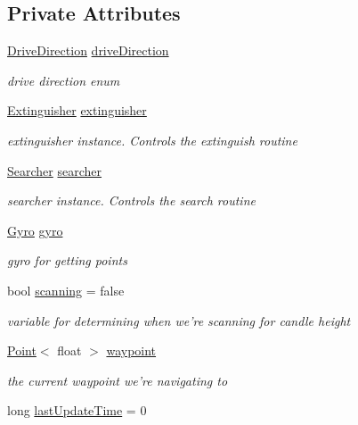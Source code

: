 \subsection*{Private Attributes}
\begin{DoxyCompactItemize}
\item 
\hyperlink{DriveMotor_8hpp_a077d9d13989efa3142086ea83cbb1e68}{Drive\-Direction} \hyperlink{classRobot_af15d2eaa46a9736e5d3d3aa9e8a9751c}{drive\-Direction}
\begin{DoxyCompactList}\small\item\em drive direction enum \end{DoxyCompactList}\item 
\hyperlink{classExtinguisher}{Extinguisher} \hyperlink{classRobot_a506ec05fcf24208b486c48367b003e96}{extinguisher}
\begin{DoxyCompactList}\small\item\em extinguisher instance. Controls the extinguish routine \end{DoxyCompactList}\item 
\hyperlink{classSearcher}{Searcher} \hyperlink{classRobot_af0ba30c47b84dc976f5bb7bd978f95ef}{searcher}
\begin{DoxyCompactList}\small\item\em searcher instance. Controls the search routine \end{DoxyCompactList}\item 
\hyperlink{classGyro}{Gyro} \hyperlink{classRobot_adafaf54e27eb3bd0cf08e32d7206e6a8}{gyro}
\begin{DoxyCompactList}\small\item\em gyro for getting points \end{DoxyCompactList}\item 
bool \hyperlink{classRobot_adcfb83201cfb8c8a7588d83aae0fc5be}{scanning} = false
\begin{DoxyCompactList}\small\item\em variable for determining when we're scanning for candle height \end{DoxyCompactList}\item 
\hyperlink{classPoint}{Point}$<$ float $>$ \hyperlink{classRobot_a4e7ca1c81831d252aa1545f549bff3f4}{waypoint}
\begin{DoxyCompactList}\small\item\em the current waypoint we're navigating to \end{DoxyCompactList}\item 
long \hyperlink{classRobot_a82a33c66efce935d2cac37c9f11c6efd}{last\-Update\-Time} = 0
\end{DoxyCompactItemize}
